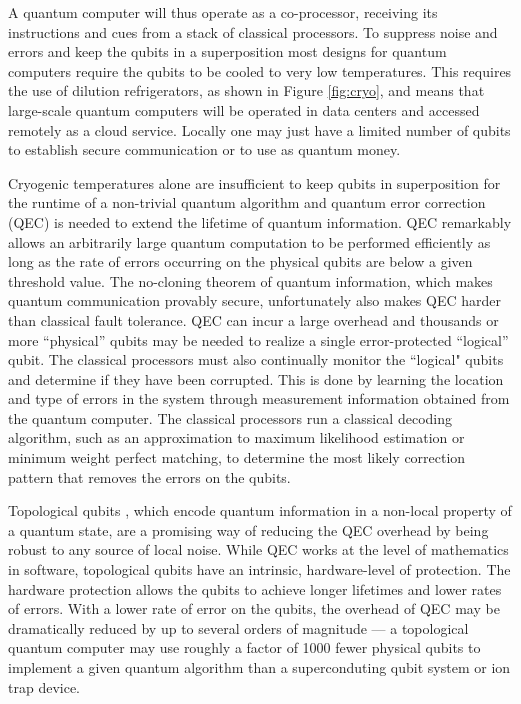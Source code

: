 \documentclass[journal]{IEEEtran}
\begin{document}
A quantum computer will thus operate as a co-processor, receiving its instructions and cues from a stack of classical processors. To suppress noise and errors and keep the qubits in a superposition most designs for quantum computers require the qubits to be cooled to very low temperatures. This requires the use of dilution refrigerators, as shown in Figure \ref{fig:cryo}, and means that large-scale quantum computers will be operated in data centers and accessed remotely as a cloud service. Locally one may just have a limited number of qubits to establish secure communication or to use as quantum money.

Cryogenic temperatures alone are insufficient to keep qubits in superposition for the runtime of a non-trivial quantum algorithm and quantum error correction (QEC) \cite{qec} is needed to extend the lifetime of quantum information.  QEC remarkably allows an arbitrarily large quantum computation to be performed efficiently as long as the rate of errors occurring on the physical qubits are below a given threshold value. The no-cloning theorem of quantum information, which makes quantum communication provably secure, unfortunately also makes QEC harder than classical fault tolerance. QEC can incur a large overhead and thousands or more ``physical'' qubits may be needed to realize a single error-protected ``logical'' qubit. The classical processors must also continually monitor the ``logical" qubits and determine if they have been corrupted.  This is done by learning the location and type of errors in the system through measurement information obtained from the quantum computer.  The classical processors run a classical decoding algorithm, such as an approximation to maximum likelihood estimation or minimum weight perfect matching, to determine the most likely correction pattern that removes the errors on the qubits. 

Topological qubits \cite{tqc}, which  encode  quantum information in a non-local property of a quantum state, are a promising way of reducing the QEC overhead by being robust to any source of local noise.  While QEC works at the level of mathematics in software, topological qubits have an intrinsic, hardware-level of protection.  The hardware protection allows the qubits to achieve longer lifetimes and lower rates of errors.  With a lower rate of error on the qubits, the overhead of QEC may be dramatically reduced by up to several orders of magnitude --- a topological quantum computer may use roughly a factor of 1000 fewer physical qubits to implement a given quantum algorithm than a superconduting qubit system or ion trap device.
\end{document}

